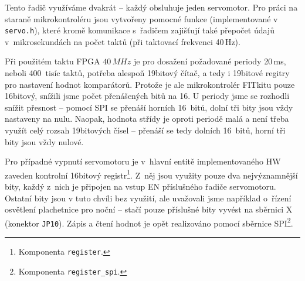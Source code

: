Tento řadič využíváme dvakrát -- každý obsluhuje jeden servomotor. Pro práci na
staraně mikrokontroléru jsou vytvořeny pomocné funkce (implementované v
\texttt{servo.h}), které kromě komunikace s~řadičem zajišťují také přepočet
údajů v~mikrosekundách na počet taktů (při taktovací frekvenci 40\,Hz).

Při použitém taktu FPGA $40\,MHz$ je pro dosažení požadované periody 20\,ms,
neboli 400~tisíc taktů, potřeba alespoň 19bitový čítač, a tedy i 19bitové
regitry pro nastavení hodnot komparátorů. Protože je ale mikrokontrolér FITkitu
pouze 16bitový, snížili jsme počet přenášených bitů na 16. U periody jsme se
rozhodli snížit přesnost -- pomocí SPI se přenáší horních 16~bitů, dolní tři
bity jsou vždy nastaveny na nulu. Naopak, hodnota střídy je oproti periodě malá
a není třeba využít celý rozsah 19bitových čísel -- přenáší se tedy dolních
16~bitů, horní tři bity jsou vždy nulové.

Pro případné vypnutí servomotoru je v~hlavní entitě implementovaného HW zaveden
kontrolní 16bitový registr\footnote{Komponenta \texttt{register}.}. Z~něj jsou
využity pouze dva nejvýznamnější bity, každý z~nich je připojen na vstup EN
příslušného řadiče servomotoru. Ostatní bity jsou v tuto chvíli bez využití, ale
uvažovali jsme například o~řízení osvětlení plachetnice pro noční  --
stačí pouze příslušné bity vyvést na sběrnici X (konektor \texttt{JP10}). Zápis
a čtení hodnot je opět realizováno pomocí sběrnice SPI\footnote{Komponenta
\texttt{register_spi}.}.



